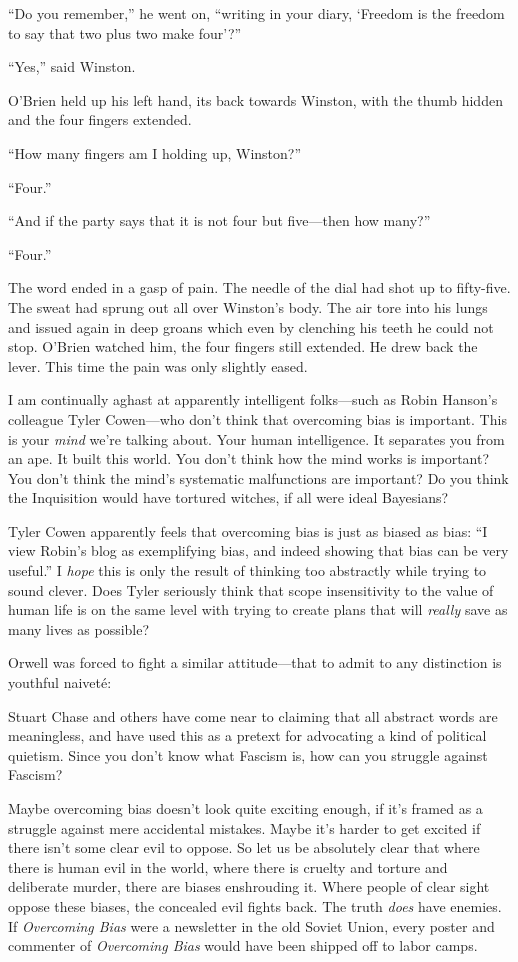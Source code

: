 {
 ``Do you remember,'' he went
on, ``writing in your diary, `Freedom
is the freedom to say that two plus two make
four'?''}

{
 ``Yes,'' said Winston.}

{
 O'Brien held up his left hand, its back towards
Winston, with the thumb hidden and the four fingers extended.}

{
 ``How many fingers am I holding up,
Winston?''}

{
 ``Four.''}

{
 ``And if the party says that it is not four but
five---then how many?''}

{
 ``Four.''}

{
 The word ended in a gasp of pain. The needle of the dial had shot
up to fifty-five. The sweat had sprung out all over
Winston's body. The air tore into his lungs and issued
again in deep groans which even by clenching his teeth he could not
stop. O'Brien watched him, the four fingers still
extended. He drew back the lever. This time the pain was only slightly
eased.}

{
 I am continually aghast at apparently intelligent folks---such as
Robin Hanson's colleague Tyler Cowen{}---who
don't think that overcoming bias is important. This is
your \textit{mind} we're talking about. Your human
intelligence. It separates you from an ape. It built this world. You
don't think how the mind works is important? You
don't think the mind's systematic
malfunctions are important? Do you think the Inquisition would have
tortured witches, if all were ideal Bayesians?}

{
 Tyler Cowen apparently feels that overcoming bias is just as
biased as bias: ``I view Robin's blog
as exemplifying bias, and indeed showing that bias can be very
useful.'' I \textit{hope} this is only the result of
thinking too abstractly while trying to sound clever. Does Tyler
seriously think that scope insensitivity to the value of human life is
on the same level with trying to create plans that will \textit{really}
save as many lives as possible?}

{
 Orwell was forced to fight a similar attitude---that to admit to
any distinction is youthful naiveté:}

{
 Stuart Chase and others have come near to claiming that all
abstract words are meaningless, and have used this as a pretext for
advocating a kind of political quietism. Since you
don't know what Fascism is, how can you struggle
against Fascism?}

{
 Maybe overcoming bias doesn't look quite exciting
enough, if it's framed as a struggle against mere
accidental mistakes. Maybe it's harder to get excited
if there isn't some clear evil to oppose. So let us be
absolutely clear that where there is human evil in the world, where
there is cruelty and torture and deliberate murder, there are biases
enshrouding it. Where people of clear sight oppose these biases, the
concealed evil fights back. The truth \textit{does} have enemies. If
\textit{Overcoming Bias} were a newsletter in the old Soviet Union,
every poster and commenter of \textit{Overcoming Bias} would have been
shipped off to labor camps.}


